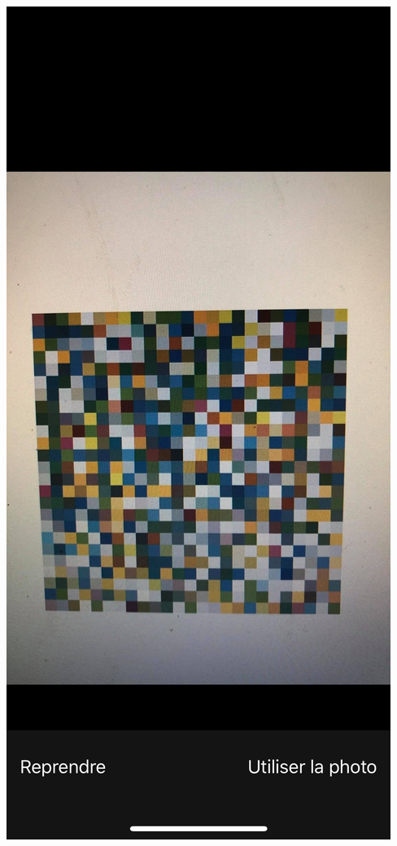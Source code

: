 \begin{frame}
\begin{columns}
\begin{column}{.33\linewidth}
                \end{column}
                \begin{column}{.33\linewidth}
                    \includegraphics[width=\linewidth]{./rsc/appli_2.png}

\end{column}
\end{columns}
\end{frame}
